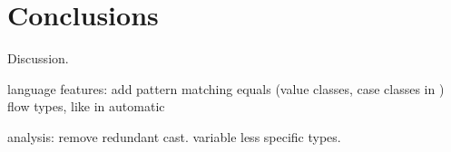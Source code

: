 
\section{Conclusions}

Discussion.

language features:
add pattern matching
equals (value classes, case classes in \scala{})
flow types, like in \kotlin{} automatic 

analysis:
remove redundant cast.
variable less specific types.